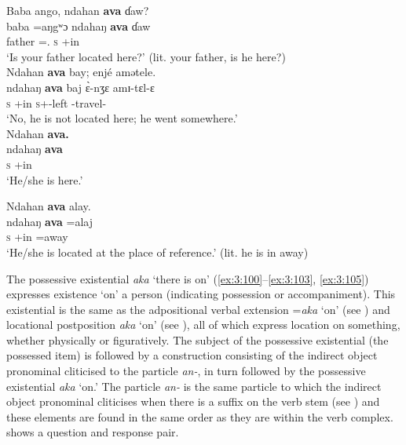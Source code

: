 \ea\label{ex:3:97}
\ea Baba  ango,  ndahan  \textbf{ava}  ɗaw? \\
\gll  baba  =aŋgʷɔ      ndahaŋ    \textbf{ava}  ɗaw \\
      father  ={\twoS}.{\POSS}    \textsc{s}        {\EXT}+in   {\QUEST} \\
\glt  `Is your father located here?' (lit. your father, is he here?)     
       \\\medskip
       \ex
 Ndahan  \textbf{ava}  bay;  enjé  amətele.\\
\gll ndahaŋ  \textbf{ava}  baj    \`{ɛ}-nʒɛ    amɪ-tɛl-ɛ\\
        \textsc{s}       {\EXT}+in  {\NEG}   \textsc{s}+{\PFV}-left {\DEP}-travel-{\CL}\\
\glt   `No, he is not located here; he went somewhere.'\\
\z\z%
\clearpage
\ea\label{ex:3:98}
Ndahan  \textbf{ava.}\\
\gll  ndahaŋ  \textbf{ava}\\
      \textsc{s}    {\EXT}+in\\
\glt  ‘He/she is here.’
\z

\ea \label{ex:3:99}
Ndahan  \textbf{ava}  alay.\\
\gll  ndahaŋ  \textbf{ava}  =alaj\\
      \textsc{s}    {\EXT}+in  =away\\
\glt  ‘He/she is located at the place of reference.’ (lit. he is in away)
\z
 
The possessive existential \textit{aka} ‘there is on’ (\ref{ex:3:100}--\ref{ex:3:103}, \ref{ex:3:105}) expresses existence ‘on’ a person (indicating possession or accompaniment).  This existential is the same as the adpositional verbal extension =\textit{aka} ‘on’ (see ) and locational postposition \textit{aka} ‘on’ (see ), all of which express location on something, whether physically or figuratively. The subject of the possessive existential (the possessed item) is followed by a construction consisting of the indirect object pronominal cliticised to the particle \textit{an-}, in turn followed by the possessive existential \textit{aka} ‘on.’ The particle \textit{an- } is the same particle to which the indirect object pronominal cliticises when there is a suffix on the verb stem (see ) and these elements are found in the same order as they are within the verb complex.  shows a question and response pair.

